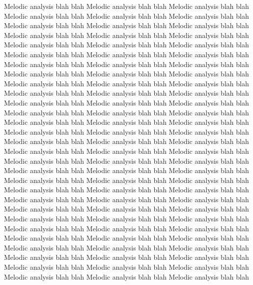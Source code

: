 Melodic analysis blah blah Melodic analysis blah blah Melodic analysis blah blah Melodic analysis blah blah Melodic analysis blah blah Melodic analysis blah blah Melodic analysis blah blah Melodic analysis blah blah Melodic analysis blah blah Melodic analysis blah blah Melodic analysis blah blah Melodic analysis blah blah Melodic analysis blah blah Melodic analysis blah blah Melodic analysis blah blah Melodic analysis blah blah Melodic analysis blah blah Melodic analysis blah blah Melodic analysis blah blah Melodic analysis blah blah Melodic analysis blah blah Melodic analysis blah blah Melodic analysis blah blah Melodic analysis blah blah Melodic analysis blah blah Melodic analysis blah blah Melodic analysis blah blah Melodic analysis blah blah Melodic analysis blah blah Melodic analysis blah blah Melodic analysis blah blah Melodic analysis blah blah Melodic analysis blah blah Melodic analysis blah blah Melodic analysis blah blah Melodic analysis blah blah Melodic analysis blah blah Melodic analysis blah blah Melodic analysis blah blah Melodic analysis blah blah Melodic analysis blah blah Melodic analysis blah blah Melodic analysis blah blah Melodic analysis blah blah Melodic analysis blah blah Melodic analysis blah blah Melodic analysis blah blah Melodic analysis blah blah Melodic analysis blah blah Melodic analysis blah blah Melodic analysis blah blah Melodic analysis blah blah Melodic analysis blah blah Melodic analysis blah blah Melodic analysis blah blah Melodic analysis blah blah Melodic analysis blah blah Melodic analysis blah blah Melodic analysis blah blah Melodic analysis blah blah Melodic analysis blah blah Melodic analysis blah blah Melodic analysis blah blah Melodic analysis blah blah Melodic analysis blah blah Melodic analysis blah blah Melodic analysis blah blah Melodic analysis blah blah Melodic analysis blah blah Melodic analysis blah blah Melodic analysis blah blah Melodic analysis blah blah Melodic analysis blah blah Melodic analysis blah blah Melodic analysis blah blah Melodic analysis blah blah Melodic analysis blah blah Melodic analysis blah blah Melodic analysis blah blah Melodic analysis blah blah Melodic analysis blah blah Melodic analysis blah blah Melodic analysis blah blah Melodic analysis blah blah Melodic analysis blah blah Melodic analysis blah blah Melodic analysis blah blah 